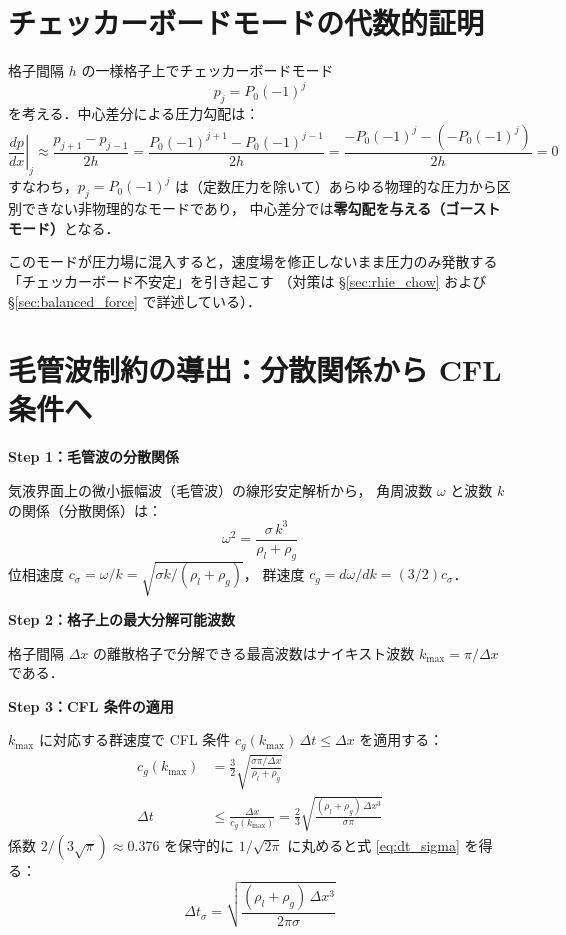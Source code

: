 \section{チェッカーボードモードの代数的証明}
\label{app:checkerboard_mode}

格子間隔 $h$ の一様格子上でチェッカーボードモード
\begin{equation}
  p_j = P_0(-1)^j
\end{equation}
を考える．中心差分による圧力勾配は：
\[
  \left.\frac{dp}{dx}\right|_j \approx \frac{p_{j+1} - p_{j-1}}{2h}
  = \frac{P_0(-1)^{j+1} - P_0(-1)^{j-1}}{2h}
  = \frac{-P_0(-1)^j - (-P_0(-1)^j)}{2h} = 0
\]
すなわち，$p_j = P_0(-1)^j$ は（定数圧力を除いて）あらゆる物理的な圧力から区別できない非物理的なモードであり，
中心差分では\textbf{零勾配を与える（ゴーストモード）}となる．

このモードが圧力場に混入すると，速度場を修正しないまま圧力のみ発散する「チェッカーボード不安定」を引き起こす
（対策は §\ref{sec:rhie_chow} および §\ref{sec:balanced_force} で詳述している）．

\section{毛管波制約の導出：分散関係から CFL 条件へ}
\label{app:capillary_cfl}

\textbf{Step 1：毛管波の分散関係}

気液界面上の微小振幅波（毛管波）の線形安定解析から，
角周波数 $\omega$ と波数 $k$ の関係（分散関係）は：
\begin{equation}
  \omega^2 = \frac{\sigma\,k^3}{\rho_l + \rho_g}
  \label{eq:capillary_dispersion_app}
\end{equation}
位相速度 $c_\sigma = \omega/k = \sqrt{\sigma k/(\rho_l+\rho_g)}$，
群速度 $c_g = d\omega/dk = (3/2)c_\sigma$．

\textbf{Step 2：格子上の最大分解可能波数}

格子間隔 $\Delta x$ の離散格子で分解できる最高波数はナイキスト波数
$k_{\max} = \pi/\Delta x$ である．

\textbf{Step 3：CFL 条件の適用}

$k_{\max}$ に対応する群速度で CFL 条件 $c_g(k_{\max})\,\Delta t \le \Delta x$ を適用する：
\begin{align*}
  c_g(k_{\max}) &= \frac{3}{2}\sqrt{\frac{\sigma\pi/\Delta x}{\rho_l+\rho_g}} \\
  \Delta t &\le \frac{\Delta x}{c_g(k_{\max})}
  = \frac{2}{3}\sqrt{\frac{(\rho_l+\rho_g)\,\Delta x^3}{\sigma\pi}}
\end{align*}
係数 $2/(3\sqrt{\pi}) \approx 0.376$ を保守的に $1/\sqrt{2\pi}$ に丸めると式 \eqref{eq:dt_sigma} を得る：
\[
  \Delta t_\sigma = \sqrt{\frac{(\rho_l+\rho_g)\,\Delta x^3}{2\pi\sigma}}
\]


